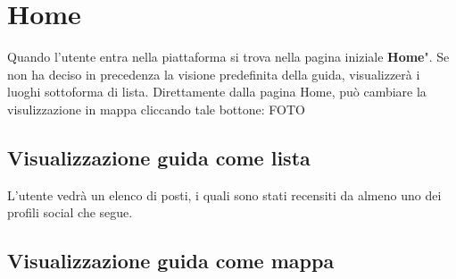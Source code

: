 \section{Home} {
    Quando l'utente entra nella piattaforma si trova nella pagina iniziale \textbf{Home}". 
    Se non ha deciso in precedenza la visione predefinita della guida, visualizzerà i luoghi sottoforma di lista. 
    Direttamente dalla pagina Home, può cambiare la visulizzazione in mappa cliccando tale bottone:
    FOTO

    \subsection{Visualizzazione guida come lista} {
        L'utente vedrà un elenco di posti, i quali sono stati recensiti da almeno uno dei profili social che segue. 
         
    }

    \subsection{Visualizzazione guida come mappa} {
        
        }
}
